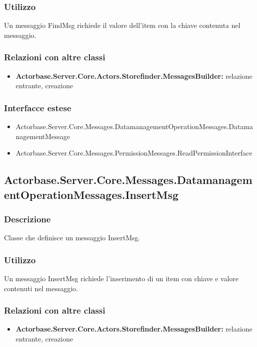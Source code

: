 \documentclass[a4paper]{article}
\begin{document}
			\subsubsection{Utilizzo}
				Un messaggio FindMsg richiede il valore dell'item con la chiave contenuta nel messaggio.
			\subsubsection{Relazioni con altre classi}
			\begin{itemize}
				\item \textbf{Actorbase.Server.Core.Actors.Storefinder.MessagesBuilder:} relazione entrante, creazione
			\end{itemize}
			\subsubsection{Interfacce estese}
			\begin{itemize}
				\item Actorbase.Server.Core.Messages.DatamanagementOperationMessages.DatamanagementMessage
				\item Actorbase.Server.Core.Messages.PermissionMessages.ReadPermissionInterface
			\end{itemize}

			\subsection{Actorbase.Server.Core.Messages.DatamanagementOperationMessages.InsertMsg}
			\subsubsection{Descrizione}
				Classe che definisce un messaggio InsertMsg.
			\subsubsection{Utilizzo}
				Un messaggio InsertMsg richiede l'inserimento di un item con chiave e valore contenuti nel messaggio.
			\subsubsection{Relazioni con altre classi}
			\begin{itemize}
				\item \textbf{Actorbase.Server.Core.Actors.Storefinder.MessagesBuilder:} relazione entrante, creazione
			\end{itemize}
\end{document}
